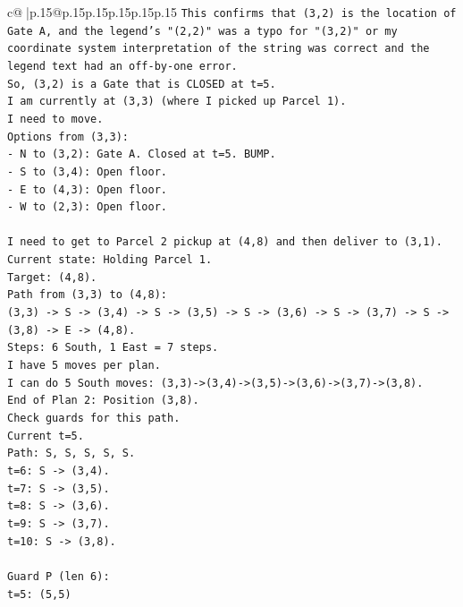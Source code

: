 \documentclass{article}
\begin{document}
{\begin{supertabular}{c@{$\;$}|p{.15\linewidth}@{}p{.15\linewidth}p{.15\linewidth}p{.15\linewidth}p{.15\linewidth}p{.15\linewidth}}
{{{\texttt{This confirms that (3,2) is the location of Gate A, and the legend's "(2,2)" was a typo for "(3,2)" or my coordinate system interpretation of the string was correct and the legend text had an off{-}by{-}one error.} \\
\texttt{So, (3,2) is a Gate that is CLOSED at t=5.} \\
\texttt{I am currently at (3,3) (where I picked up Parcel 1).} \\
\texttt{I need to move.} \\
\texttt{Options from (3,3):} \\
\texttt{{-} N to (3,2): Gate A. Closed at t=5. BUMP.} \\
\texttt{{-} S to (3,4): Open floor.} \\
\texttt{{-} E to (4,3): Open floor.} \\
\texttt{{-} W to (2,3): Open floor.} \\
\\ 
\texttt{I need to get to Parcel 2 pickup at (4,8) and then deliver to (3,1).} \\
\texttt{Current state: Holding Parcel 1.} \\
\texttt{Target: (4,8).} \\
\texttt{Path from (3,3) to (4,8):} \\
\texttt{(3,3) {-}> S {-}> (3,4) {-}> S {-}> (3,5) {-}> S {-}> (3,6) {-}> S {-}> (3,7) {-}> S {-}> (3,8) {-}> E {-}> (4,8).} \\
\texttt{Steps: 6 South, 1 East = 7 steps.} \\
\texttt{I have 5 moves per plan.} \\
\texttt{I can do 5 South moves: (3,3){-}>(3,4){-}>(3,5){-}>(3,6){-}>(3,7){-}>(3,8).} \\
\texttt{End of Plan 2: Position (3,8).} \\
\texttt{Check guards for this path.} \\
\texttt{Current t=5.} \\
\texttt{Path: S, S, S, S, S.} \\
\texttt{t=6: S {-}> (3,4).} \\
\texttt{t=7: S {-}> (3,5).} \\
\texttt{t=8: S {-}> (3,6).} \\
\texttt{t=9: S {-}> (3,7).} \\
\texttt{t=10: S {-}> (3,8).} \\
\\ 
\texttt{Guard P (len 6):} \\
\texttt{t=5: (5,5)} \\
}}}
\end{supertabular}}
\end{document}
